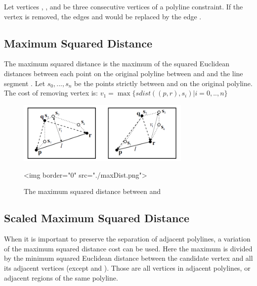 Let vertices , , and  be three consecutive vertices of a polyline constraint. If the vertex  is removed,
the edges  and  would be replaced by the
edge .  


\subsection{Maximum Squared Distance}


The maximum squared distance is the maximum of the squared Euclidean distances between each 
point on the original polyline  between  and  and the line segment . Let $s_0,...,s_n$ be the points strictly between  and  on the original polyline.
The cost of removing vertex  is: $ v_1 = \max \{ sdist((p,r), s_i) | i=0,..,n\} $

\begin{figure}[ht]
\begin{center}
 \begin{ccTexOnly}
   \includegraphics[height=3cm]{Polyline_simplification_2/maxDist.png}
 \end{ccTexOnly}
 \begin{ccHtmlOnly}
   <img border="0" src="./maxDist.png">
 \end{ccHtmlOnly}
   \label{figure:maxDist}
\end{center}
\caption{The maximum squared distance between  and }
\end{figure}


\subsection{Scaled Maximum Squared Distance}

When it is important to preserve the separation of adjacent polylines, a variation of the maximum squared
distance cost can be used. Here the maximum is divided by the minimum squared Euclidean distance between
the candidate vertex  and all its adjacent vertices (except  and ). Those are all vertices in
adjacent polylines, or adjacent regions of the same polyline.

